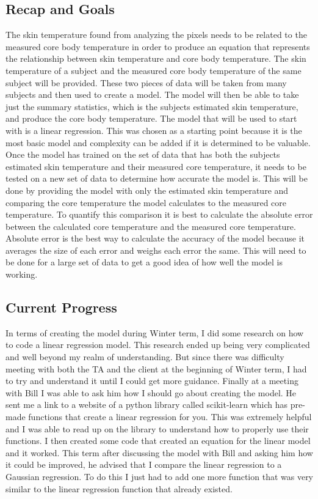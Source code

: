 \documentclass[onecolumn, draftclsnofoot,10pt, compsoc]{IEEEtran}
\begin{document}
\subsection{Recap and Goals}
	The skin temperature found from analyzing the pixels needs to be related to the measured core body temperature in order to produce an equation that represents the relationship between skin temperature and core body temperature. The skin temperature of a subject and the measured core body temperature of the same subject will be provided. These two pieces of data will be taken from many subjects and then used to create a model. The model will then be able to take just the summary statistics, which is the subjects estimated skin temperature, and produce the core body temperature. The model that will be used to start with is a linear regression. This was chosen as a starting point because it is the most basic model and complexity can be added if it is determined to be valuable.
	Once the model has trained on the set of data that has both the subjects estimated skin temperature and their measured core temperature, it needs to be tested on a new set of data to determine how accurate the model is. This will be done by providing the model with only the estimated skin temperature and comparing the core temperature the model calculates to the measured core temperature. To quantify this comparison it is best to calculate the absolute error between the calculated core temperature and the measured core temperature. Absolute error is the best way to calculate the accuracy of the model because it averages the size of each error and weighs each error the same. This will need to be done for a large set of data to get a good idea of how well the model is working. \cite{BiancaTech}
	
	


\subsection{Current Progress}


In terms of creating the model during Winter term, I did some research on how to code a linear regression model. This research ended up being very complicated and well beyond my realm of understanding. But since there was difficulty meeting with both the TA and the client at the beginning of Winter term, I had to try and understand it until I could get more guidance. Finally at a meeting with Bill I was able to ask him how I should go about creating the model. He sent me a link to a website of a python library called scikit-learn which has pre-made functions that create a linear regression for you. This was extremely helpful and I was able to read up on the library to understand how to properly use their functions. I then created some code that created an equation for the linear model and it worked. This term after discussing the model with Bill and asking him how it could be improved, he advised that I compare the linear regression to a Gaussian regression. To do this I just had to add one more function that was very similar to the linear regression function that already existed. 
\end{document}
